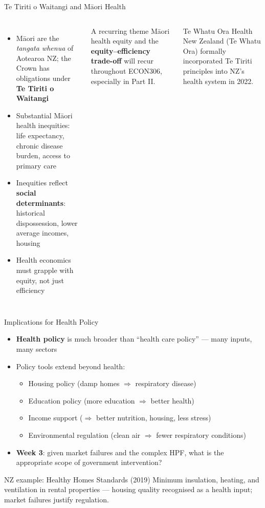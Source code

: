 \documentclass[aspectratio=169, 12pt]{beamer}
\begin{document}
\begin{frame}{Te Tiriti o Waitangi and M\=aori Health}
  \begin{columns}
      \small
      \begin{itemize}
        \item M\=aori are the \textit{tangata whenua} of Aotearoa NZ; the Crown has
              obligations under \textbf{Te Tiriti o Waitangi}
        \item Substantial M\=aori health inequities: life expectancy, chronic disease
              burden, access to primary care
        \item Inequities reflect \textbf{social determinants}: historical dispossession,
              lower average incomes, housing
        \item Health economics must grapple with equity, not just efficiency
      \end{itemize}
      \begin{alertblock}{A recurring theme}
        \small M\=aori health equity and the \textbf{equity--efficiency trade-off}
        will recur throughout ECON306, especially in Part II.
      \end{alertblock}
      \vspace{0.3em}
      \begin{block}{Te Whatu Ora}
        \small Health New Zealand (Te Whatu Ora) formally incorporated Te Tiriti principles
        into NZ's health system in 2022.
      \end{block}
  \end{columns}
\end{frame}

\begin{frame}{Implications for Health Policy}
  \begin{itemize}
    \item \textbf{Health policy} is much broader than ``health care policy'' — many inputs,
          many sectors
    \item Policy tools extend beyond health:
    \begin{itemize}
      \item Housing policy (damp homes $\Rightarrow$ respiratory disease)
      \item Education policy (more education $\Rightarrow$ better health)
      \item Income support ($\Rightarrow$ better nutrition, housing, less stress)
      \item Environmental regulation (clean air $\Rightarrow$ fewer respiratory conditions)
    \end{itemize}
    \item \textbf{Week 3}: given market failures and the complex HPF, what is the
          appropriate scope of government intervention?
  \end{itemize}
  \begin{exampleblock}{NZ example: Healthy Homes Standards (2019)}
    Minimum insulation, heating, and ventilation in rental properties --- housing quality
    recognised as a health input; market failures justify regulation.
  \end{exampleblock}
\end{frame}
\end{document}
